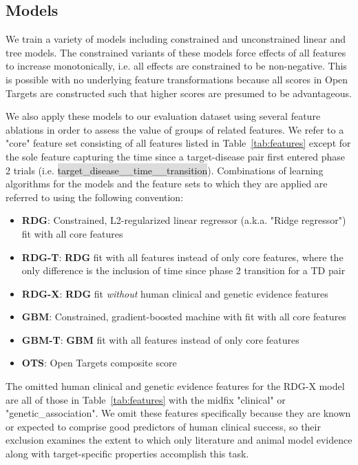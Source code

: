 \documentclass{article}
\begin{document}
\subsection{Models}
\label{sec:models}

We train a variety of models including constrained and unconstrained linear and tree models. The constrained variants of these models force effects of all features to increase monotonically, i.e. all effects are constrained to be non-negative. This is possible with no underlying feature transformations because all scores in Open Targets are constructed such that higher scores are presumed to be advantageous. 

We also apply these models to our evaluation dataset using several feature ablations in order to assess the value of groups of related features. We refer to a "core" feature set consisting of all features listed in Table~\ref{tab:features} except for the sole feature capturing the time since a target-disease pair first entered phase 2 trials (i.e. \colorbox{Gainsboro}{target\_disease\_\_time\_\_transition}). Combinations of learning algorithms for the models and the feature sets to which they are applied are referred to using the following convention:

\begin{itemize}
  \item \textbf{RDG}: Constrained, L2-regularized linear regressor (a.k.a. "Ridge regressor") fit with all core features
  \item \textbf{RDG-T}: \textbf{RDG} fit with all features instead of only core features, where the only difference is the inclusion of time since phase 2 transition for a TD pair
  \item \textbf{RDG-X}: \textbf{RDG} fit \textit{without} human clinical and genetic evidence features
  \item \textbf{GBM}: Constrained, gradient-boosted machine with fit with all core features
  \item \textbf{GBM-T}: \textbf{GBM} fit with all features instead of only core features
  \item \textbf{OTS}: Open Targets composite score
\end{itemize}

The omitted human clinical and genetic evidence features for the RDG-X model are all of those in Table~\ref{tab:features} with the midfix "clinical" or "genetic\_association". We omit these features specifically because they are known or expected to comprise good predictors of human clinical success, so their exclusion examines the extent to which only literature and animal model evidence along with target-specific properties accomplish this task.
\end{document}
